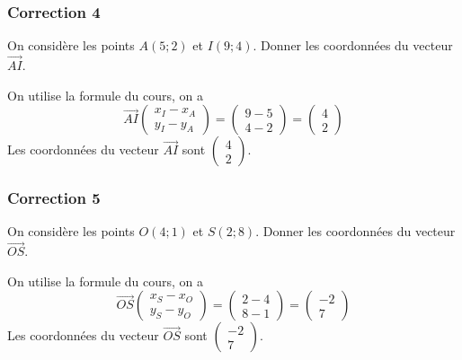 \documentclass[15pt, mathserif]{beamer}
\begin{document}
\begin{frame}
\vspace{-10mm}
	\frametitle{Correction 4}
On considère les points $A(5;2)$ et $I(9;4)$. Donner les coordonnées du vecteur $ \overrightarrow{AI}$. 
 
 On utilise la formule du cours, on a 
 $$\overrightarrow{ AI}\begin{pmatrix} x_{I}-x_{A} \\ y_{I}-y_{A} \end{pmatrix}=\begin{pmatrix} 9-5\\ 4-2\end{pmatrix}=\begin{pmatrix} 4\\ 2\end{pmatrix}$$ Les coordonnées du vecteur $\overrightarrow{AI}$ sont $\begin{pmatrix} 4\\ 2\end{pmatrix}$.\end{frame}


\begin{frame}
\vspace{-10mm}
	\frametitle{Correction 5}
On considère les points $O(4;1)$ et $S(2;8)$. Donner les coordonnées du vecteur $ \overrightarrow{OS}$. 
 
 On utilise la formule du cours, on a 
 $$\overrightarrow{ OS}\begin{pmatrix} x_{S}-x_{O} \\ y_{S}-y_{O} \end{pmatrix}=\begin{pmatrix} 2-4\\ 8-1\end{pmatrix}=\begin{pmatrix} -2\\ 7\end{pmatrix}$$ Les coordonnées du vecteur $\overrightarrow{OS}$ sont $\begin{pmatrix} -2\\ 7\end{pmatrix}$.\end{frame}
\end{document}
